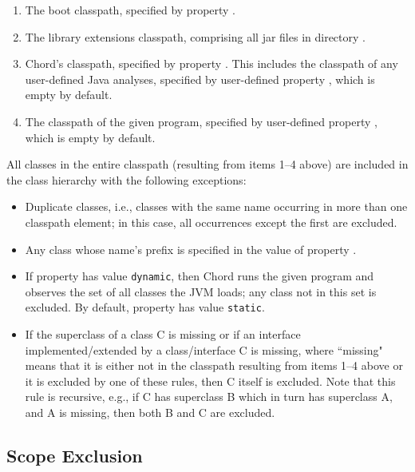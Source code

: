 \begin{enumerate}
\item
The boot classpath, specified by property .
\item
The library extensions classpath, comprising all jar files in
directory .
\item
Chord's classpath, specified by property
.  This includes the classpath of any
user-defined Java analyses, specified by user-defined property
, which is empty by default.
\item
The classpath of the given program, specified by user-defined property
, which is empty by default.
\end{enumerate}

All classes in the entire classpath (resulting from items 1--4 above)
are included in the class hierarchy with the following exceptions:
\begin{itemize}
\item
Duplicate classes, i.e., classes with the same name occurring in more
than one classpath element; in this case, all occurrences except the
first are excluded.
\item
Any class whose name's prefix is specified in the value of property
.
\item
If property  has value {\tt dynamic}, then
Chord runs the given program and observes the set of all classes the
JVM loads; any class not in this set is excluded.  By default,
property  has value {\tt static}.
\item
If the superclass of a class C is missing or if an interface
implemented/extended by a class/interface C is missing, where
``missing" means that it is either not in the classpath resulting from
items 1--4 above or it is excluded by one of these rules, then C
itself is excluded.  Note that this rule is recursive, e.g., if C has
superclass B which in turn has superclass A, and A is missing, then
both B and C are excluded.
\end{itemize}

\subsection{Scope Exclusion}



